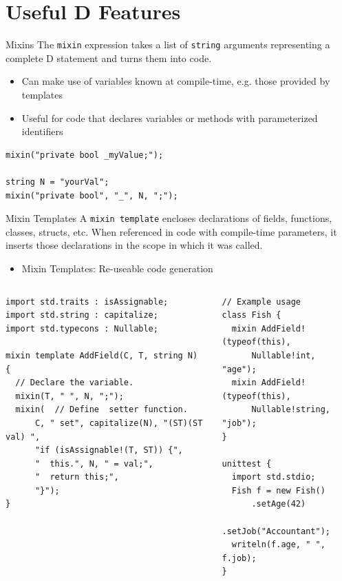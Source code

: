 \documentclass[bigger]{beamer}
\begin{document}
\section{Useful D Features}
\label{sec:org522b973}

\begin{frame}[label={sec:org3dc95d7},fragile]{Mixins}
 The \texttt{mixin} expression takes a list of \texttt{string} arguments representing a complete D statement and
turns them into code.
\begin{itemize}
\item Can make use of variables known at compile-time, e.g. those provided by templates
\item Useful for code that declares variables or methods with parameterized identifiers
\end{itemize}

\begin{verbatim}
mixin("private bool _myValue;");

string N = "yourVal";
mixin("private bool", "_", N, ";");
\end{verbatim}
\end{frame}

\begin{frame}[label={sec:orgd1bfaed},fragile]{Mixin Templates}
 A \texttt{mixin template} encloses declarations of fields, functions, classes, structs, etc. When referenced
in code with compile-time parameters, it inserts those declarations in the scope in which it was
called.
\begin{itemize}
\item \alert{Mixin Templates}: Re-useable code generation
\end{itemize}

\begin{columns}
\begin{column}{0.6\columnwidth}
\scriptsize
\begin{verbatim}
import std.traits : isAssignable;
import std.string : capitalize;
import std.typecons : Nullable;

mixin template AddField(C, T, string N) {
  // Declare the variable.
  mixin(T, " ", N, ";");
  mixin(  // Define  setter function.
      C, " set", capitalize(N), "(ST)(ST val) ",
      "if (isAssignable!(T, ST)) {",
      "  this.", N, " = val;",
      "  return this;",
      "}");
}
\end{verbatim}
\end{column}

\begin{column}{0.4\columnwidth}
\scriptsize
\begin{verbatim}
// Example usage
class Fish {
  mixin AddField!(typeof(this),
      Nullable!int, "age");
  mixin AddField!(typeof(this),
      Nullable!string, "job");
}

unittest {
  import std.stdio;
  Fish f = new Fish()
      .setAge(42)
      .setJob("Accountant");
  writeln(f.age, " ", f.job);
}
\end{verbatim}
\end{column}
\end{columns}
\end{frame}
\end{document}
